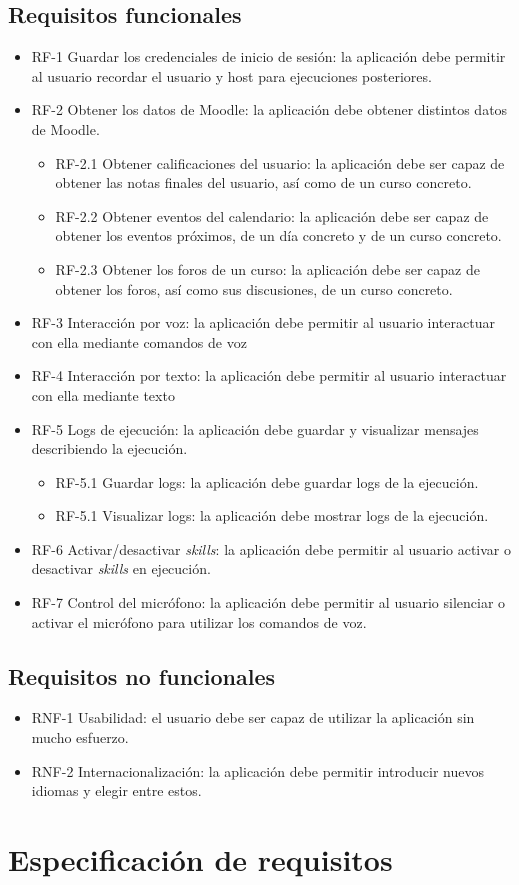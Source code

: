 \subsection{Requisitos funcionales}
\begin{itemize}
	\item RF-1 Guardar los credenciales de inicio de sesión: la aplicación debe permitir al usuario recordar el usuario y host para ejecuciones posteriores.
	\item RF-2 Obtener los datos de Moodle: la aplicación debe obtener distintos datos de Moodle.
	\begin{itemize}
		\item RF-2.1 Obtener calificaciones del usuario: la aplicación debe ser capaz de obtener las notas finales del usuario, así como de un curso concreto.
		\item RF-2.2 Obtener eventos del calendario: la aplicación debe ser capaz de obtener los eventos próximos, de un día concreto y de un curso concreto.
		\item RF-2.3 Obtener los foros de un curso: la aplicación debe ser capaz de obtener los foros, así como sus discusiones, de un curso concreto.
	\end{itemize}
	\item RF-3 Interacción por voz: la aplicación debe permitir al usuario interactuar con ella mediante comandos de voz
	\item RF-4 Interacción por texto: la aplicación debe permitir al usuario interactuar con ella mediante texto
	\item RF-5 Logs de ejecución: la aplicación debe guardar y visualizar mensajes describiendo la ejecución.
	\begin{itemize}
		\item RF-5.1 Guardar logs: la aplicación debe guardar logs de la ejecución.
		\item RF-5.1 Visualizar logs: la aplicación debe mostrar logs de la ejecución.
	\end{itemize}
	\item RF-6 Activar/desactivar \textit{skills}: la aplicación debe permitir al usuario activar o desactivar \textit{skills} en ejecución.
	\item RF-7 Control del micrófono: la aplicación debe permitir al usuario silenciar o activar el micrófono para utilizar los comandos de voz.
\end{itemize}

\subsection{Requisitos no funcionales}
\begin{itemize}
	\item RNF-1 Usabilidad: el usuario debe ser capaz de utilizar la aplicación sin mucho esfuerzo.
	\item RNF-2 Internacionalización: la aplicación debe permitir introducir nuevos idiomas y elegir entre estos.
\end{itemize}

\section{Especificación de requisitos}

